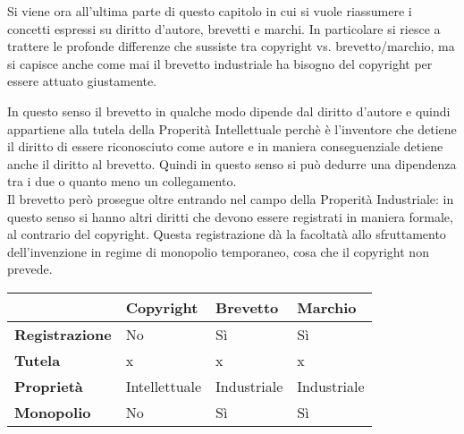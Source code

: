 Si viene ora all'ultima parte di questo capitolo in cui si vuole riassumere i concetti espressi su diritto d'autore, brevetti e marchi. In particolare si riesce a trattere le profonde differenze che sussiste tra copyright vs. brevetto/marchio, ma si capisce anche come mai il brevetto industriale ha bisogno del copyright per essere attuato giustamente.

In questo senso il brevetto in qualche modo dipende dal diritto d'autore e quindi appartiene alla tutela della Properità Intellettuale perchè è l'inventore che detiene il diritto di essere riconosciuto come autore e in maniera conseguenziale detiene anche il diritto al brevetto. Quindi in questo senso si può dedurre una dipendenza tra i due o quanto meno un collegamento.\\
Il brevetto però prosegue oltre entrando nel campo della Properità Industriale: in questo senso si hanno altri diritti che devono essere registrati in maniera formale, al contrario del copyright. Questa registrazione dà la facoltatà allo sfruttamento dell'invenzione in regime di monopolio temporaneo, cosa che il copyright non prevede.

\begin{tabular}{l|l|l|l}
	~ & \textbf{Copyright} & \textbf{Brevetto} & \textbf{Marchio} \\ \hline
	\textbf{Registrazione} & No & Sì & Sì \\ \hline
	\textbf{Tutela} & x & x & x\\ \hline
	\textbf{Proprietà} & Intellettuale & Industriale & Industriale \\ \hline
	\textbf{Monopolio} & No & Sì & Sì
\end{tabular}


